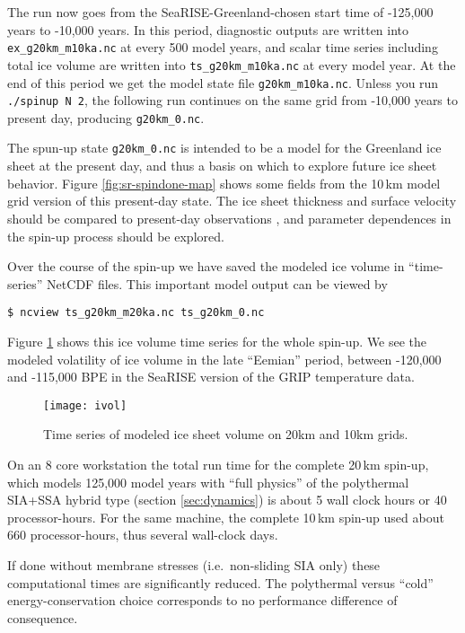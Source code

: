 The run now goes from the SeaRISE-Greenland-chosen start time of -125,000 years to -10,000 years.  In this period, diagnostic outputs are written into \texttt{ex_g20km_m10ka.nc} at every 500 model years, and scalar time series including total ice volume are written into \texttt{ts_g20km_m10ka.nc} at every model year.  At the end of this period we get the model state file \texttt{g20km_m10ka.nc}. Unless you run \texttt{./spinup N 2}, the following run continues on the same grid from -10,000 years to present day, producing \texttt{g20km_0.nc}.

The spun-up state \texttt{g20km_0.nc} is intended to be a model for the Greenland ice sheet at the present day, and thus a basis on which to explore future ice sheet behavior.  Figure \ref{fig:sr-spindone-map} shows some fields from the 10\,km model grid version of this present-day state.  The ice sheet thickness and surface velocity should be compared to present-day observations \cite{BKAJS}, and parameter dependences in the spin-up process should be explored.

Over the course of the spin-up we have saved the modeled ice volume in ``time-series'' NetCDF files.  This important model output can be viewed by
\begin{verbatim}
$ ncview ts_g20km_m20ka.nc ts_g20km_0.nc
\end{verbatim}
\noindent Figure \ref{fig:sr-spindone-ivolboth} shows this ice volume time series for the whole spin-up.  We see the modeled volatility of ice volume in the late ``Eemian'' period, between -120,000 and -115,000 BPE in the SeaRISE version of the GRIP temperature data.

\begin{figure}[ht]
\centering
\texttt{[image: ivol]}
\caption{Time series of modeled ice sheet volume on 20km and 10km grids.}
\label{fig:sr-spindone-ivolboth}
\end{figure}

On an 8 core workstation the total run time for the complete 20\,km spin-up, which models 125,000 model years with ``full physics'' of the polythermal SIA+SSA hybrid type (section \ref{sec:dynamics}) is about 5 wall clock hours or 40 processor-hours.  For the same machine, the complete 10\,km spin-up used about 660 processor-hours, thus several wall-clock days.

If done without membrane stresses (i.e.~non-sliding SIA only) these computational times are significantly reduced.  The polythermal versus ``cold'' energy-conservation choice corresponds to no performance difference of consequence.


